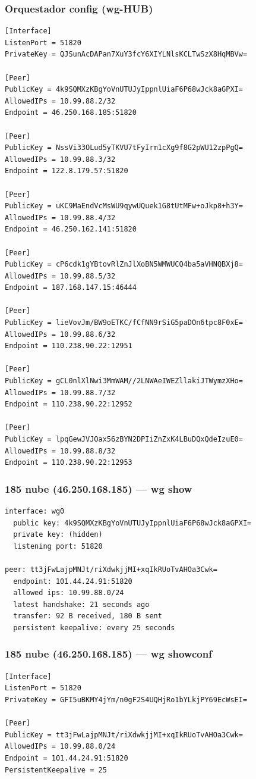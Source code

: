 \documentclass[11pt,a4paper]{article}
\begin{document}
\subsubsection*{Orquestador config (wg-HUB)}
\begin{lstlisting}
[Interface]
ListenPort = 51820
PrivateKey = QJSunAcDAPan7XuY3fcY6XIYLNlsKCLTwSzX8HqMBVw=

[Peer]
PublicKey = 4k9SQMXzKBgYoVnUTUJyIppnlUiaF6P68wJck8aGPXI=
AllowedIPs = 10.99.88.2/32
Endpoint = 46.250.168.185:51820

[Peer]
PublicKey = NssVi33OLud5yTKVU7tFyIrm1cXg9f8G2pWU12zpPgQ=
AllowedIPs = 10.99.88.3/32
Endpoint = 122.8.179.57:51820

[Peer]
PublicKey = uKC9MaEndVcMsWU9qywUQuek1G8tUtMFw+oJkp8+h3Y=
AllowedIPs = 10.99.88.4/32
Endpoint = 46.250.162.141:51820

[Peer]
PublicKey = cP6cdk1gYBtovRlZnJlXoBN5WMWUCQ4ba5aVHNQBXj8=
AllowedIPs = 10.99.88.5/32
Endpoint = 187.168.147.15:46444

[Peer]
PublicKey = lieVovJm/BW9oETKC/fCfNN9rSiG5paDOn6tpc8F0xE=
AllowedIPs = 10.99.88.6/32
Endpoint = 110.238.90.22:12951

[Peer]
PublicKey = gCL0nlXlNwi3MmWAM//2LNWAeIWEZllakiJTWymzXHo=
AllowedIPs = 10.99.88.7/32
Endpoint = 110.238.90.22:12952

[Peer]
PublicKey = lpqGewJVJOax56zBYN2DPIiZnZxK4LBuDQxQdeIzuE0=
AllowedIPs = 10.99.88.8/32
Endpoint = 110.238.90.22:12953

\end{lstlisting}

\subsubsection*{185 nube (46.250.168.185) — wg show}
\begin{lstlisting}
interface: wg0
  public key: 4k9SQMXzKBgYoVnUTUJyIppnlUiaF6P68wJck8aGPXI=
  private key: (hidden)
  listening port: 51820

peer: tt3jFwLajpMNJt/riXdwkjjMI+xqIkRUoTvAHOa3Cwk=
  endpoint: 101.44.24.91:51820
  allowed ips: 10.99.88.0/24
  latest handshake: 21 seconds ago
  transfer: 92 B received, 180 B sent
  persistent keepalive: every 25 seconds

\end{lstlisting}

\subsubsection*{185 nube (46.250.168.185) — wg showconf}
\begin{lstlisting}
[Interface]
ListenPort = 51820
PrivateKey = GFI5uBKMY4jYm/n0gF2S4UQHjRo1bYLkjPY69EcWsEI=

[Peer]
PublicKey = tt3jFwLajpMNJt/riXdwkjjMI+xqIkRUoTvAHOa3Cwk=
AllowedIPs = 10.99.88.0/24
Endpoint = 101.44.24.91:51820
PersistentKeepalive = 25

\end{lstlisting}
\end{document}
